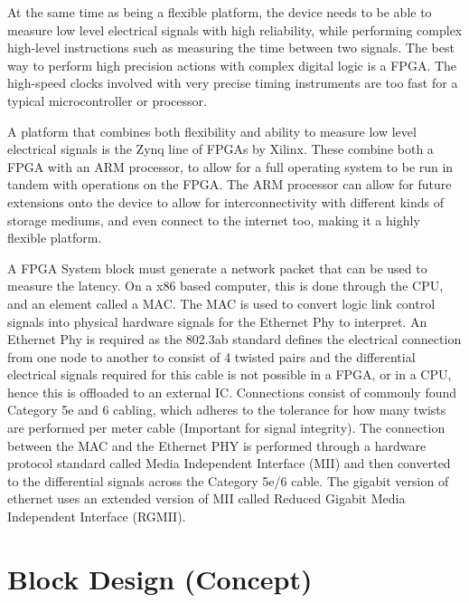 At the same time as being a flexible platform, the device needs to be able to measure low level electrical signals 
with high reliability, while performing complex high-level instructions such as measuring the time between two 
signals. The best way to perform high precision actions with complex digital logic is a FPGA. The high-speed clocks 
involved with very precise timing instruments are too fast for a typical microcontroller or processor. 

A platform that combines both flexibility and ability to measure low level electrical signals is the Zynq line of 
FPGAs by Xilinx. These combine both a FPGA with an ARM processor, to allow for a full operating system to be run in 
tandem with operations on the FPGA.  The ARM processor can allow for future extensions onto the device to allow for 
interconnectivity with different kinds of storage mediums, and even connect to the internet too, making it a highly 
flexible platform. 

A FPGA System block must generate a network packet that can be used to measure the latency. On a x86 based computer, 
this is done through the CPU, and an element called a MAC. The MAC is used to convert logic link control signals 
into physical hardware signals for the Ethernet Phy to interpret. An Ethernet Phy is required as the 802.3ab 
standard defines the electrical connection from one node to another to consist of 4 twisted pairs and the 
differential electrical signals required for this cable is not possible in a FPGA, or in a CPU, hence this is 
offloaded to an external IC. Connections consist of commonly found Category 5e and 6 cabling, which adheres to the 
tolerance for how many twists are performed per meter cable (Important for signal integrity). The connection between 
the MAC and the Ethernet PHY is performed through a hardware protocol standard called Media Independent Interface 
(MII) and then converted to the differential signals across the Category 5e/6 cable. The gigabit version of ethernet 
uses an extended version of MII called Reduced Gigabit Media Independent Interface (RGMII).

\section{Block Design (Concept)}

\vspace{-3mm}

